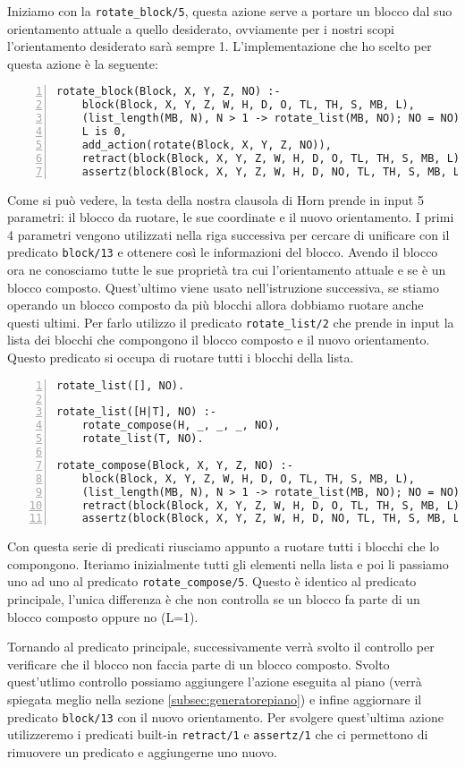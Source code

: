 Iniziamo con la \verb+rotate_block/5+, questa azione serve a portare un blocco dal suo orientamento attuale a quello desiderato, ovviamente per i nostri scopi l'orientamento desiderato sarà sempre 1.
L'implementazione che ho scelto per questa azione è la seguente:
\begin{lstlisting}[numbers=left]
rotate_block(Block, X, Y, Z, NO) :-
    block(Block, X, Y, Z, W, H, D, O, TL, TH, S, MB, L),
    (list_length(MB, N), N > 1 -> rotate_list(MB, NO); NO = NO),
    L is 0,
    add_action(rotate(Block, X, Y, Z, NO)),
    retract(block(Block, X, Y, Z, W, H, D, O, TL, TH, S, MB, L)),
    assertz(block(Block, X, Y, Z, W, H, D, NO, TL, TH, S, MB, L)).
\end{lstlisting}
Come si può vedere, la testa della nostra clausola di Horn prende in input 5 parametri: il blocco da ruotare, le sue coordinate e il nuovo orientamento. I primi 4 parametri vengono utilizzati nella riga successiva per cercare di unificare con il predicato \verb+block/13+ e ottenere così le informazioni del blocco.
Avendo il blocco ora ne conosciamo tutte le sue proprietà tra cui l'orientamento attuale e se è un blocco composto. Quest'ultimo viene usato nell'istruzione successiva, se stiamo operando un blocco composto da più blocchi allora dobbiamo ruotare anche questi ultimi. Per farlo utilizzo il predicato \verb+rotate_list/2+ che prende in input la lista dei blocchi che compongono il blocco composto e il nuovo orientamento. Questo predicato si occupa di ruotare tutti i blocchi della lista.
\begin{lstlisting}[numbers=left]
rotate_list([], NO).

rotate_list([H|T], NO) :-
    rotate_compose(H, _, _, _, NO),
    rotate_list(T, NO).

rotate_compose(Block, X, Y, Z, NO) :-
    block(Block, X, Y, Z, W, H, D, O, TL, TH, S, MB, L),
    (list_length(MB, N), N > 1 -> rotate_list(MB, NO); NO = NO),
    retract(block(Block, X, Y, Z, W, H, D, O, TL, TH, S, MB, L)),
    assertz(block(Block, X, Y, Z, W, H, D, NO, TL, TH, S, MB, L)).
\end{lstlisting}
Con questa serie di predicati riusciamo appunto a ruotare tutti i blocchi che lo compongono. Iteriamo inizialmente tutti gli elementi nella lista e poi li passiamo uno ad uno al predicato \verb+rotate_compose/5+. Questo è identico al predicato principale, l'unica differenza è che non controlla se un blocco fa parte di un blocco composto oppure no (L=1).

Tornando al predicato principale, successivamente verrà svolto il controllo per verificare che il blocco non faccia parte di un blocco composto. Svolto quest'utlimo controllo possiamo aggiungere l'azione eseguita al piano (verrà spiegata meglio nella sezione \ref{subsec:generatorepiano}) e infine aggiornare il predicato \verb+block/13+ con il nuovo orientamento.
Per svolgere quest'ultima azione utilizzeremo i predicati built-in \verb+retract/1+ e \verb+assertz/1+ che ci permettono di rimuovere un predicato e aggiungerne uno nuovo.

